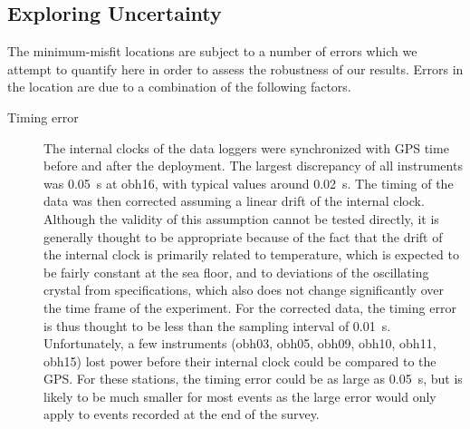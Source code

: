 \documentclass[jgr]{agu2001}
\begin{document}
\begin{article}
\section{Exploring Uncertainty}

The minimum-misfit locations are subject to a number of errors which
we attempt to quantify here in order to assess the robustness of our results.
   Errors in the location are due to a combination of
the following factors.
\begin{description}
\item[Timing error]  The internal clocks of the data loggers were
synchronized with GPS time before and after the deployment.  The
largest discrepancy of all instruments was 0.05~s at obh16, with
typical values around 0.02~s.  The
timing of the data was then corrected assuming a linear drift of the
internal clock. Although the validity of this assumption cannot be
tested directly, it is generally thought to be appropriate because of
the fact that the drift of the internal clock is primarily related to
temperature, which is expected to be fairly constant at
the sea floor, and to deviations of the oscillating crystal from
specifications, which also does not change significantly over the 
time frame of the experiment. For the corrected data, the timing error
is thus thought to be less than the sampling interval of 0.01~s.
Unfortunately, a few instruments (obh03,
obh05, obh09, obh10, obh11, obh15) lost
power before their internal clock could be compared to the GPS.  For
these stations, the timing error could be as large as 0.05~s, but is
likely to be much smaller for most events as the large error would
only apply to events recorded at the end of the survey.


\end{description}
\end{article}
\end{document}
